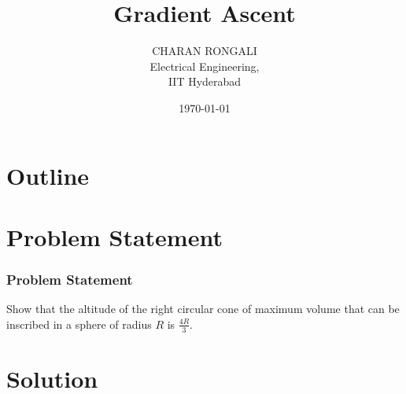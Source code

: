 \documentclass{beamer}
\title{Gradient Ascent}
\author{CHARAN RONGALI \\ Electrical Engineering,\\IIT Hyderabad}
\date{\today}
\numberwithin{equation}{section}
\begin{document}
\begin{frame}
\titlepage
\end{frame}

\section*{Outline}
\begin{frame}
\tableofcontents
\end{frame}

\section{Problem Statement}
\begin{frame}
\frametitle{Problem Statement}
Show that the altitude of the right circular cone of maximum volume that can be inscribed in a sphere of radius $R$ is $\frac{4R}{3}$.
\end{frame}

\section{Solution}
\end{document}
